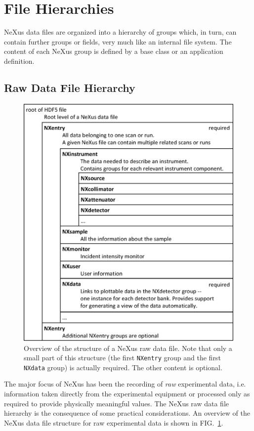 \documentclass[%
 aip,
rsi,
 amsmath,amssymb,
 reprint,%
]{revtex4-1}
\begin{document}
\section{File Hierarchies}
NeXus data files are organized into a hierarchy of groups which, in turn, can contain further groups or fields, 
very much like an internal file system. The content of each NeXus group is defined by a base class or an application definition.


\subsection{Raw Data File Hierarchy}

\begin{figure}
\includegraphics[width=\columnwidth]{figure1}
\caption{\label{rawfile}Overview of the structure of a NeXus raw data file. Note that only a small part of this structure (the first \texttt{NXentry} group and the first \texttt{NXdata} group) is actually required.  The other content is optional.
}
\end{figure}

The major focus of NeXus has been the recording of \emph{raw} experimental data, i.e. information taken directly from the experimental 
equipment or processed only as required to provide physically meaningful values.
The NeXus raw data file hierarchy is the consequence of some practical considerations. 
An overview of the NeXus data file structure for raw experimental data is shown in FIG.~\ref{rawfile}.
\end{document}
